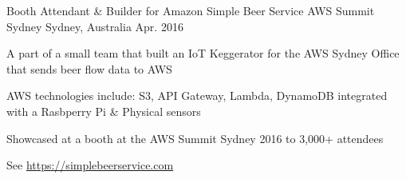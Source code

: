\begin{cventries}
  \cventry
    {Booth Attendant \& Builder for Amazon Simple Beer Service} %
    {AWS Summit Sydney} %
    {Sydney, Australia} %
    {Apr. 2016} %
    {
      \begin{cvitems} %
        \item {A part of a small team that built an IoT Keggerator for the AWS Sydney Office that sends beer flow data to AWS}
        \item {AWS technologies include: S3, API Gateway, Lambda, DynamoDB integrated with a Rasbperry Pi \& Physical sensors}
        \item {Showcased at a booth at the AWS Summit Sydney 2016 to 3,000+ attendees}
        \item {See \url{https://simplebeerservice.com}}
      \end{cvitems}
    }
\end{cventries}
